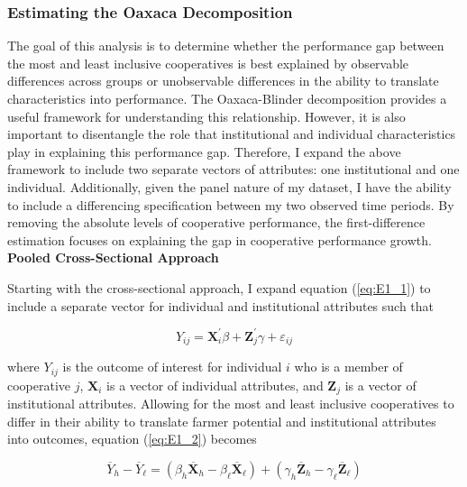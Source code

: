 \documentclass[11pt]{article}
\begin{document}
\subsubsection{Estimating the Oaxaca Decomposition} \label{sec:E1_est}

The goal of this analysis is to determine whether the performance gap between the most and least inclusive cooperatives is best explained by observable differences across groups or unobservable differences in the ability to translate characteristics into performance. The Oaxaca-Blinder decomposition provides a useful framework for understanding this relationship. However, it is also important to disentangle the role that institutional and individual characteristics play in explaining this performance gap. Therefore, I expand the above framework to include two separate vectors of attributes: one institutional and one individual. Additionally, given the panel nature of my dataset, I have the ability to include a differencing specification between my two observed time periods. By removing the absolute levels of cooperative performance, the first-difference estimation focuses on explaining the gap in cooperative performance growth. \\

\noindent \textbf{Pooled Cross-Sectional Approach}

Starting with the cross-sectional approach, I expand equation (\ref{eq:E1_1}) to include a separate vector for individual and institutional attributes such that

\begin{equation} \label{eq:E1_4}
   Y_{ij} = \mathbf{X}_i^{\prime}\beta + \mathbf{Z}_j^{\prime}\gamma + \varepsilon_{ij}
\end{equation}  

where $Y_{ij}$ is the outcome of interest for individual $i$ who is a member of cooperative $j$, $\mathbf{X}_i$ is a vector of individual attributes, and $\mathbf{Z}_j$ is a vector of institutional attributes. Allowing for the most and least inclusive cooperatives to differ in their ability to translate farmer potential and institutional attributes into outcomes, equation (\ref{eq:E1_2}) becomes

\begin{equation} \label{eq:E1_5}
        \overline{Y}_{h} - \overline{Y}_{\ell} =  (\beta_{h}\overline{\mathbf{X}}_{h} - \beta_{\ell}\overline{\mathbf{X}}_{\ell}) + (\gamma_{h}\overline{\mathbf{Z}}_{h} - \gamma_{\ell}\overline{\mathbf{Z}}_{\ell})
\end{equation}  
\end{document}
